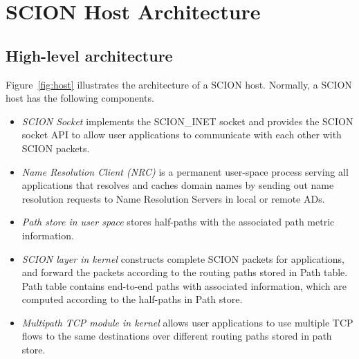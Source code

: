 
\section{SCION Host Architecture}

\subsection{High-level architecture}

Figure~\ref{fig:host} illustrates the architecture of a SCION host.
Normally, a SCION host has the following components.

\begin{itemize}
\item{\em SCION Socket} implements the SCION\_INET socket and provides the SCION socket API to allow user applications to communicate with each other with SCION packets.

\item{\em Name Resolution Client (NRC)} is a permanent user-space process serving all applications that resolves and caches domain names by sending out name resolution requests to Name Resolution Servers in local or remote ADs.

\item{\em Path store in user space} stores half-paths with the associated path metric information. %


\item{\em SCION layer in kernel} constructs complete SCION packets for applications, and forward the packets according to the routing paths stored in Path
table. Path table contains end-to-end paths with associated
information, which are computed according to the half-paths in Path
store.

\item{\em Multipath TCP module in kernel} allows user applications to use multiple TCP flows to the same destinations over different routing paths stored in path store.


\end{itemize}
